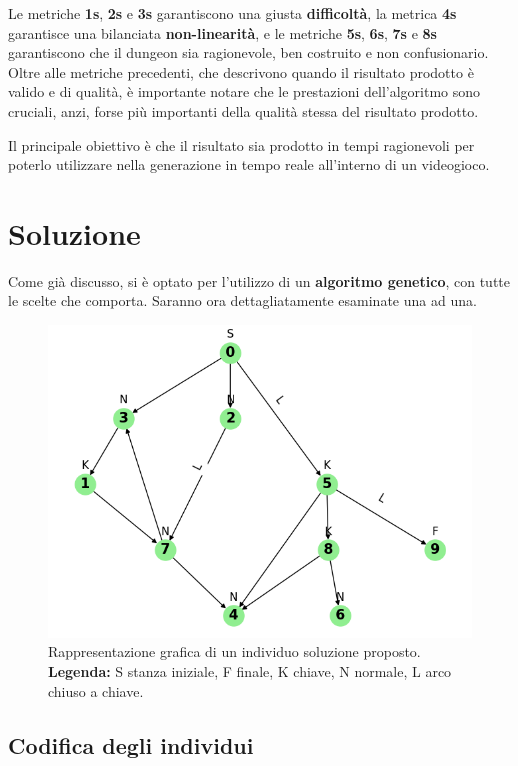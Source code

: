\documentclass[12pt,titlepage]{article}
\begin{document}
\noindent Le metriche \textbf{1s}, \textbf{2s} e \textbf{3s} garantiscono una giusta \textbf{difficoltà}, la metrica \textbf{4s} garantisce una bilanciata \textbf{non-linearità}, e le metriche \textbf{5s}, \textbf{6s}, \textbf{7s} e \textbf{8s} garantiscono che il dungeon sia ragionevole, ben costruito e non confusionario.\\

\noindent Oltre alle metriche precedenti, che descrivono quando il risultato prodotto è valido e di qualità, è importante notare che le prestazioni dell'algoritmo sono cruciali, anzi, forse più importanti della qualità stessa del risultato prodotto.

Il principale obiettivo è che il risultato sia prodotto in tempi ragionevoli per poterlo utilizzare nella generazione in tempo reale all'interno di un videogioco.

\section{Soluzione}

Come già discusso, si è optato per l'utilizzo di un \textbf{algoritmo genetico}, con tutte le scelte che comporta. Saranno ora dettagliatamente esaminate una ad una.

\begin{figure}[h]
    \centering
    \includegraphics[width=0.65\linewidth]{assets/solution-example.png}
    \caption{Rappresentazione grafica di un individuo soluzione proposto.\\\textbf{Legenda:} S stanza iniziale, F finale, K chiave, N normale, L arco chiuso a chiave.}
\end{figure}

\subsection {Codifica degli individui}
\end{document}
